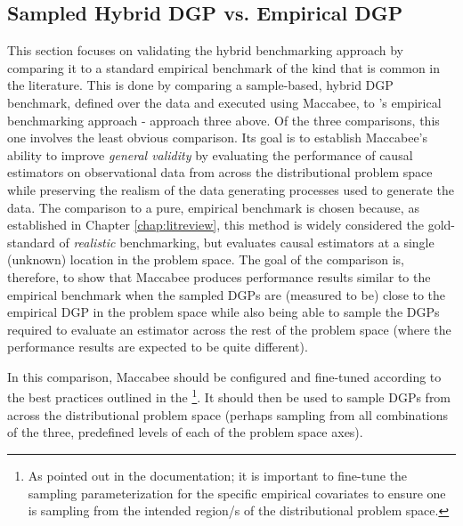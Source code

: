\documentclass[../main.tex]{subfiles}
\begin{document}
\subsection{Sampled Hybrid DGP vs. Empirical DGP}

This section focuses on validating the hybrid benchmarking approach by comparing it to a standard empirical benchmark of the kind that is common in the literature. This is done by comparing a sample-based, hybrid DGP benchmark, defined over the \textcite{Lalonde1986EvaluatingData} data and executed using Maccabee, to \citeauthor{Diamond2013GeneticStudies}'s empirical benchmarking approach - approach three above. Of the three comparisons, this one involves the least obvious comparison. Its goal is to establish Maccabee's ability to improve \textit{general validity} by evaluating the performance of causal estimators on observational data from across the distributional problem space while preserving the realism of the data generating processes used to generate the data. The comparison to a pure, empirical benchmark is chosen because, as established in Chapter \ref{chap:litreview}, this method is widely considered the gold-standard of \textit{realistic} benchmarking, but evaluates causal estimators at a single (unknown) location in the problem space. The goal of the comparison is, therefore, to show that Maccabee produces performance results similar to the empirical benchmark when the sampled DGPs are (measured to be) close to the empirical DGP in the problem space while also being able to sample the DGPs required to evaluate an estimator across the rest of the problem space (where the performance results are expected to be quite different).

\vspace{\baselineskip}

In this comparison, Maccabee should be configured and fine-tuned according to the best practices outlined in the \footnote{As pointed out in the documentation; it is important to fine-tune the sampling parameterization for the specific empirical covariates to ensure one is sampling from the intended region/s of the distributional problem space.}. It should then be used to sample DGPs from across the distributional problem space (perhaps sampling from all combinations of the three, predefined levels of each of the problem space axes).

\vspace{\baselineskip}
\end{document}

